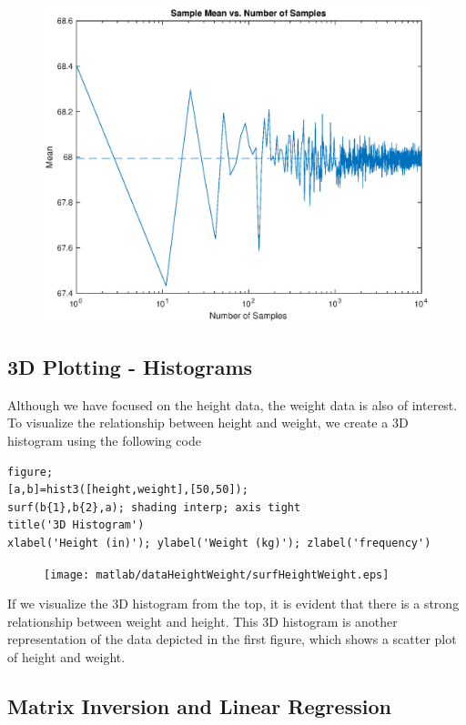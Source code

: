 \documentclass[12pt]{article}
\begin{document}
\begin{figure}[H]
\centering
\includegraphics[width=0.75\linewidth]{matlab/dataHeightWeight/plotLawLargeNum.eps}
\end{figure}

\subsection{3D Plotting - Histograms}

Although we have focused on the height data, the weight data is also of interest. To visualize the relationship between height and weight, we create a 3D histogram using the following code

\begin{lstlisting}[frame=single]
%% 3D Histogram
figure;
[a,b]=hist3([height,weight],[50,50]);
surf(b{1},b{2},a); shading interp; axis tight
title('3D Histogram')
xlabel('Height (in)'); ylabel('Weight (kg)'); zlabel('frequency')
\end{lstlisting}

\begin{figure}[H]
\centering
\texttt{[image: matlab/dataHeightWeight/surfHeightWeight.eps]}
\end{figure}

If we visualize the 3D histogram from the top, it is evident that there is a strong relationship between weight and height. This 3D histogram is another representation of the data depicted in the first figure, which shows a scatter plot of height and weight. 

\subsection{Matrix Inversion and Linear Regression}
\end{document}
